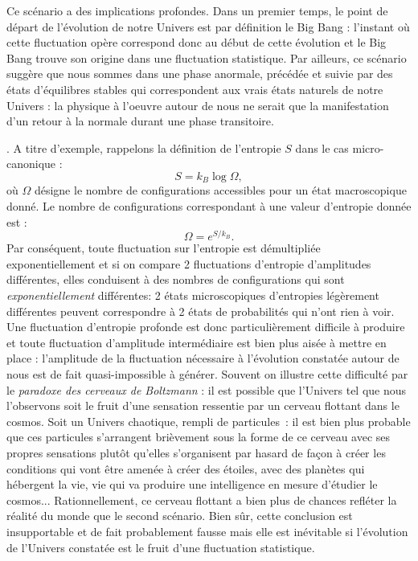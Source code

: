Ce scénario a des implications profondes. Dans un premier temps, le point de départ de l'évolution de notre Univers est par définition le Big Bang : l'instant où cette fluctuation opère correspond donc au début de cette évolution et le Big Bang trouve son origine dans une fluctuation statistique. Par ailleurs, ce scénario suggère que nous sommes dans une phase anormale, précédée et suivie par des états d'équilibres stables qui correspondent aux vrais états naturels de notre Univers : la physique à l'oeuvre autour de nous ne serait que la manifestation d'un retour à la normale durant une phase transitoire.

. A titre d'exemple, rappelons la définition de l'entropie $S$ dans le cas micro-canonique :
\begin{equation}
S=k_B\log{\Omega},
\end{equation}
où $\Omega$ désigne le nombre de configurations accessibles pour un état macroscopique donné. Le nombre de configurations correspondant à une valeur d'entropie donnée est :
\begin{equation}
\Omega=e^{S/k_B}.
\end{equation}
Par conséquent, toute fluctuation sur l'entropie est démultipliée exponentiellement et si on compare 2 fluctuations d'entropie d'amplitudes différentes, elles conduisent à des nombres de configurations qui sont \textit{exponentiellement} différentes: 2 états microscopiques d'entropies légèrement différentes peuvent correspondre à 2 états de probabilités qui n'ont rien à voir. Une fluctuation d'entropie profonde est donc particulièrement difficile à produire et toute fluctuation d'amplitude intermédiaire est bien plus aisée à mettre en place : l'amplitude de la fluctuation nécessaire à l'évolution constatée autour de nous est de fait quasi-impossible à générer. Souvent on illustre cette difficulté par le \textit{paradoxe des cerveaux de Boltzmann} : il est possible que l'Univers tel que nous l'observons soit le fruit d'une sensation ressentie par un cerveau flottant dans le cosmos. Soit un Univers chaotique, rempli de particules~: il est bien plus probable que ces particules s'arrangent brièvement sous la forme de ce cerveau avec ses propres sensations plutôt qu'elles s'organisent par  hasard de façon à créer les conditions qui vont être amenée à créer des étoiles, avec des planètes qui hébergent la vie, vie qui va produire une intelligence en mesure d'étudier le cosmos... Rationnellement, ce cerveau flottant a bien plus de chances refléter la réalité du monde que le second scénario. Bien sûr, cette conclusion est insupportable et de fait probablement fausse mais elle est inévitable si l'évolution de l'Univers constatée est le fruit d'une fluctuation statistique.

